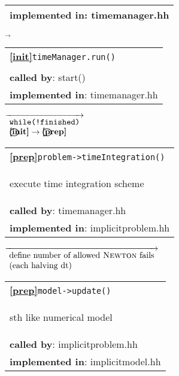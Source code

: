 \begin{landscape}
{\begin{tabular}{|l|}
    \textbf{implemented in}: timemanager.hh \\  
    \hline
  \end{tabular}
    $\overrightarrow{}$
  \begin{tabular}{|l|}\hline
    \textbf{\textcircled{\ref{init}}}\verb+timeManager.run()+\\ 
    \begin{scriptsize}\end{scriptsize}\\
    \textbf{called by}: {start()}\\
    \textbf{implemented in}: {timemanager.hh}\\  
    \hline
  \end{tabular} 
{\scriptsize
    $\overrightarrow{ %
      \begin{array}{l} %
	\textnormal{\texttt{while(!finished)}}\\
	\textbf{\textbf{\textcircled{\ref{init}}}} \rightarrow \textbf{\textcircled{\ref{prep}} }
      \end{array}
    }$}
  \begin{tabular}{|l|}
    \hline
    \textbf{\textcircled{\ref{prep}}}\verb+problem->timeIntegration()+ \\
    \begin{scriptsize}execute time integration scheme \end{scriptsize}\\
    \textbf{called by}: timemanager.hh\\
    \textbf{implemented in}: implicitproblem.hh\\  
\hline
  \end{tabular}    
\nextline
    {\scriptsize$\overrightarrow{
      \begin{array}{l}
	\textnormal{define number of allowed \textsc{Newton} fails} \\
	\textnormal{(each halving dt)}
      \end{array}
    }$}
      \begin{tabular}{|l|}
    \hline
    \textbf{\textcircled{\ref{prep}}}\verb+model->update()+ \\
    \begin{scriptsize}sth like numerical model\end{scriptsize}\\
    \textbf{called by}: implicitproblem.hh\\
    \textbf{implemented in}: implicitmodel.hh\\  

\end{tabular}}
\end{landscape}
